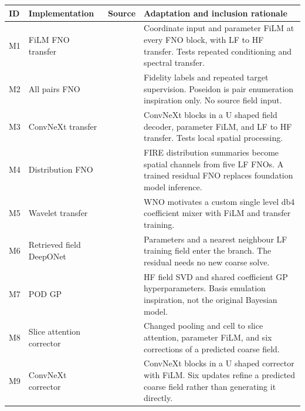 \begin{tabular}{p{.045\linewidth}p{.20\linewidth}p{.23\linewidth}p{.39\linewidth}}
\toprule
ID & Implementation & Source & Adaptation and inclusion rationale \\
\midrule
M1 & FiLM FNO transfer & \citep{li2021fno,perez2018,lyu2023} & Coordinate input and parameter FiLM at every FNO block, with LF to HF transfer. Tests repeated conditioning and spectral transfer. \\
M2 & All pairs FNO & \citep{li2021fno,perez2018,herde2024} & Fidelity labels and repeated target supervision. Poseidon is pair enumeration inspiration only. No source field input. \\
M3 & ConvNeXt transfer & \citep{liu2022convnext,ronneberger2015,perez2018,lyu2023} & ConvNeXt blocks in a U shaped field decoder, parameter FiLM, and LF to HF transfer. Tests local spatial processing. \\
M4 & Distribution FNO & \citep{yu2026fire,li2021fno} & FIRE distribution summaries become spatial channels from five LF FNOs. A trained residual FNO replaces foundation model inference. \\
M5 & Wavelet transfer & \citep{tripura2022wno,perez2018,lyu2023} & WNO motivates a custom single level db4 coefficient mixer with FiLM and transfer training. \\
M6 & Retrieved field DeepONet & \citep{lu2021,lu2022mf} & Parameters and a nearest neighbour LF training field enter the branch. The residual needs no new coarse solve. \\
M7 & POD GP & \citep{higdon2008} & HF field SVD and shared coefficient GP hyperparameters. Basis emulation inspiration, not the original Bayesian model. \\
M8 & Slice attention corrector & \citep{wu2024transolver,perez2018} & Changed pooling and cell to slice attention, parameter FiLM, and six corrections of a predicted coarse field. \\
M9 & ConvNeXt corrector & \citep{liu2022convnext,ronneberger2015,perez2018} & ConvNeXt blocks in a U shaped corrector with FiLM. Six updates refine a predicted coarse field rather than generating it directly. \\
\bottomrule
\end{tabular}
